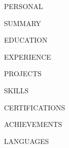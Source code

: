 \documentclass[letterpaper,11pt]{article}
\begin{document}
{{PERSONAL}}

\vspace{4pt}

{{SUMMARY}}

{{EDUCATION}}

{{EXPERIENCE}}

{{PROJECTS}}

{{SKILLS}}

{{CERTIFICATIONS}}

{{ACHIEVEMENTS}}

{{LANGUAGES}}
\end{document}
